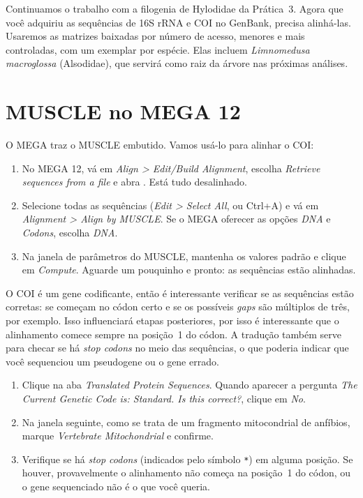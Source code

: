 \documentclass[11pt,a4paper]{article}
\newcommand{\arq}[1]{\path{#1}}
\newcommand{\ui}[1]{\textit{#1}}
\newcommand{\tecla}[1]{\textsf{#1}}
\begin{document}
Continuamos o trabalho com a filogenia de Hylodidae da Prática~3. Agora que você adquiriu as
sequências de 16S rRNA e COI no GenBank, precisa alinhá-las. Usaremos as matrizes baixadas
por número de acesso, menores e mais controladas, com um exemplar por espécie. Elas incluem
\emph{Limnomedusa macroglossa} (Alsodidae), que servirá como raiz da árvore nas próximas
análises.

\section{MUSCLE no MEGA 12}\label{sec:mega}

O MEGA \cite{kumar2024} traz o MUSCLE embutido. Vamos usá-lo para alinhar o COI:
\begin{enumerate}
\item No MEGA 12, vá em \ui{Align > Edit/Build Alignment}, escolha \ui{Retrieve sequences
from a file} e abra \arq{sequencias/COI_ids.fasta}. Está tudo desalinhado.
\item Selecione todas as sequências (\ui{Edit > Select All}, ou \tecla{Ctrl+A}) e vá em
\ui{Alignment > Align by MUSCLE}. Se o MEGA oferecer as opções \ui{DNA} e \ui{Codons},
escolha \ui{DNA}.
\item Na janela de parâmetros do MUSCLE, mantenha os valores padrão e clique em \ui{Compute}.
Aguarde um pouquinho e pronto: as sequências estão alinhadas.
\end{enumerate}

O COI é um gene codificante, então é interessante verificar se as sequências estão corretas:
se começam no códon certo e se os possíveis \emph{gaps} são múltiplos de três, por exemplo.
Isso influenciará etapas posteriores, por isso é interessante que o alinhamento comece sempre
na posição~1 do códon. A tradução também serve para checar se há \emph{stop codons} no meio
das sequências, o que poderia indicar que você sequenciou um pseudogene ou o gene errado.

\begin{enumerate}[resume]
\item Clique na aba \ui{Translated Protein Sequences}. Quando aparecer a pergunta
\ui{The Current Genetic Code is: Standard. Is this correct?}, clique em \ui{No}.
\item Na janela seguinte, como se trata de um fragmento mitocondrial de anfíbios, marque
\ui{Vertebrate Mitochondrial} e confirme.
\item Verifique se há \emph{stop codons} (indicados pelo símbolo \texttt{*}) em alguma
posição. Se houver, provavelmente o alinhamento não começa na posição~1 do códon, ou o gene
sequenciado não é o que você queria.
\end{enumerate}
\end{document}
